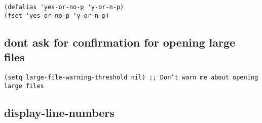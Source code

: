 \documentclass[11pt]{article}
\begin{document}
\begin{verbatim}
(defalias 'yes-or-no-p 'y-or-n-p)
(fset 'yes-or-no-p 'y-or-n-p)
\end{verbatim}

\subsection*{dont ask for confirmation for opening large files}
\label{sec:org6a6d059}

\begin{verbatim}
(setq large-file-warning-threshold nil) ;; Don’t warn me about opening large files
\end{verbatim}

\subsection*{display-line-numbers}
\label{sec:org5662c1e}
\end{document}
